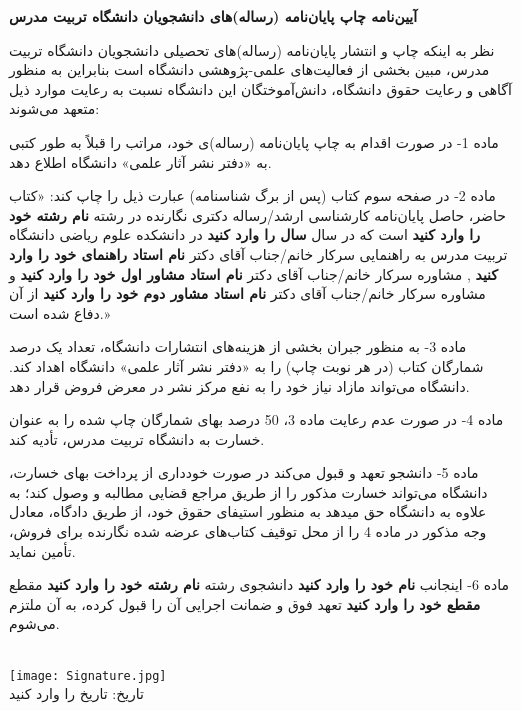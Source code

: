 %
%
%
%
%
%
\begin{center}
\textbf{
آیین‌نامه چاپ پایان‌نامه (رساله)های دانشجویان دانشگاه تربیت مدرس
}
\end{center}
\thispagestyle{empty}
نظر به اینکه چاپ و انتشار پایان‌نامه (رساله)های تحصیلی دانشجویان دانشگاه تربیت مدرس، مبین بخشی از فعالیت‌های علمی-پژوهشی دانشگاه است بنابراین به منظور آگاهی و رعایت حقوق دانشگاه، دانش‌آموختگان این دانشگاه نسبت به رعایت موارد ذیل متعهد می‌شوند:

ماده 1- در صورت اقدام به چاپ پایان‌نامه (رساله)ی خود، مراتب را قبلاً به طور کتبی به «دفتر نشر آثار علمی» دانشگاه اطلاع دهد.

ماده 2- در صفحه سوم کتاب (پس از برگ شناسنامه) عبارت ذیل را چاپ کند: «کتاب حاضر، حاصل پایان‌نامه کارشناسی ارشد/رساله دکتری نگارنده در رشته 
\textbf{
نام رشته خود را وارد کنید
}
است که در سال
\textbf{
سال را وارد کنید
}
در دانشکده علوم ریاضی دانشگاه تربیت مدرس به راهنمایی سرکار خانم/جناب آقای دکتر 
\textbf{
نام استاد راهنمای خود را وارد کنید
},
مشاوره سرکار خانم/جناب آقای دکتر
\textbf{ 
نام استاد مشاور اول خود را وارد کنید
}
و مشاوره سرکار خانم/جناب آقای دکتر 
\textbf{
نام استاد مشاور دوم خود را وارد کنید
}
از آن دفاع شده است.» 

ماده 3- به منظور جبران بخشی از هزینه‌های انتشارات دانشگاه، تعداد یک درصد شمارگان کتاب (در هر نوبت چاپ) را به «دفتر نشر آثار علمی» دانشگاه اهداد کند. دانشگاه می‌تواند مازاد نیاز خود را به نفع مرکز نشر در معرض فروض قرار دهد.

ماده 4- در صورت عدم رعایت ماده 3، 50 درصد بهای شمارگان چاپ شده را به عنوان خسارت به دانشگاه تربیت مدرس، تأدیه کند.

ماده 5- دانشجو تعهد و قبول می‌کند در صورت خودداری از پرداخت بهای خسارت، دانشگاه می‌تواند خسارت مذکور را از طریق مراجع قضایی مطالبه و وصول کند؛ به علاوه به دانشگاه حق می\nf دهد به منظور استیفای حقوق خود، از طریق دادگاه، معادل وجه مذکور در ماده 4 را از محل توقیف کتاب‌های عرضه شده نگارنده برای فروش، تأمین نماید.

ماده 6- اینجانب 
\textbf{
نام خود را وارد کنید
}
دانشجوی رشته 
\textbf{
نام رشته خود را وارد کنید
}
مقطع
\textbf{
مقطع خود را وارد کنید
}
تعهد فوق و ضمانت اجرایی آن را قبول کرده، به آن ملتزم می‌شوم.  
\begin{flushleft}
\\
\texttt{[image: Signature.jpg]}
\\
تاریخ:
تاریخ را وارد کنید
\end{flushleft}